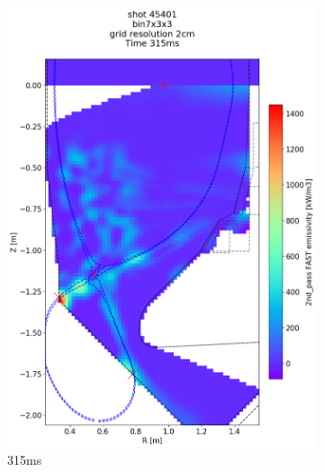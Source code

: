 \begin{figure}
     \centering
     \begin{subfigure}{0.395\linewidth}
         \centering
         \includegraphics[trim={75 90 0 190},clip,width=\textwidth]{Chapters/chapter2/figs/IRVB-MASTU_shot-45401_export_88.png}
         \vspace*{-6.5mm}
         \caption{315ms}
         \label{fig:45401_export2_1}
     \end{subfigure}
     \begin{subfigure}{0.395\linewidth}
         \centering

\end{subfigure}
\end{figure}
